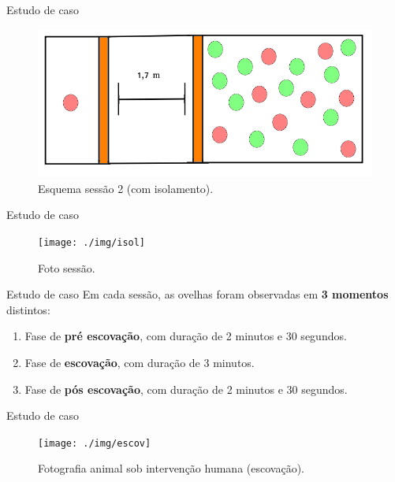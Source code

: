 \documentclass[
  ignorenonframetext,
  serif,
  professionalfont,
  usenames,
  dvipsnames,
  aspectratio = 169]{beamer}
\begin{document}
\begin{frame}{Estudo de caso}
\protect\hypertarget{estudo-de-caso-5}{}
\begin{figure}

{\centering \includegraphics[width=0.7\linewidth]{./img/se2} 

}

\caption{Esquema sessão 2 (com isolamento).}\label{fig:unnamed-chunk-6}
\end{figure}
\end{frame}

\begin{frame}{Estudo de caso}
\protect\hypertarget{estudo-de-caso-6}{}
\begin{figure}

{\centering \texttt{[image: ./img/isol]} 

}

\caption{Foto sessão.}\label{fig:unnamed-chunk-7}
\end{figure}
\end{frame}

\begin{frame}{Estudo de caso}
\protect\hypertarget{estudo-de-caso-7}{}
Em cada sessão, as ovelhas foram observadas em \textbf{3 momentos}
distintos:

\begin{enumerate}
\item
  Fase de \textbf{pré escovação}, com duração de 2 minutos e 30
  segundos.
\item
  Fase de \textbf{escovação}, com duração de 3 minutos.
\item
  Fase de \textbf{pós escovação}, com duração de 2 minutos e 30
  segundos.
\end{enumerate}
\end{frame}

\begin{frame}{Estudo de caso}
\protect\hypertarget{estudo-de-caso-8}{}
\begin{figure}

{\centering \texttt{[image: ./img/escov]} 

}

\caption{Fotografia animal sob intervenção humana (escovação).}\label{fig:unnamed-chunk-8}
\end{figure}
\end{frame}
\end{document}
